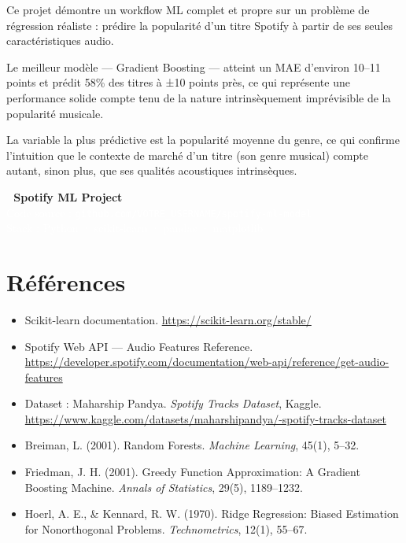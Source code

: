 \documentclass[12pt, a4paper]{article}
\begin{document}
Ce projet démontre un workflow ML complet et propre sur un problème de régression
réaliste : prédire la popularité d'un titre Spotify à partir de ses seules
caractéristiques audio.

Le meilleur modèle — Gradient Boosting — atteint un MAE d'environ 10–11 points et
prédit 58\% des titres à ±10 points près, ce qui représente une performance solide
compte tenu de la nature intrinsèquement imprévisible de la popularité musicale.

La variable la plus prédictive est la popularité moyenne du genre, ce qui confirme
l'intuition que le contexte de marché d'un titre (son genre musical) compte autant,
sinon plus, que ses qualités acoustiques intrinsèques.

\vspace{1cm}
\begin{center}
  \begin{tcolorbox}[colback=spotdark, colframe=spotdark, width=0.85\textwidth,
                    halign=center, rounded corners]
    \textcolor{spotgreen}{\large\bfseries 🎵 Spotify ML Project}\\[0.3cm]
    \textcolor{white}{\small Code source :
      \textcolor{spotgreen}{\texttt{github.com/VOTRE\_USERNAME/spotify-ml-model}}}\\
    \textcolor{white}{\small Stack : Python · scikit-learn · pandas · matplotlib}
  \end{tcolorbox}
\end{center}

\newpage
\section*{Références}

\begin{itemize}[leftmargin=1.5cm]
  \item Scikit-learn documentation. \url{https://scikit-learn.org/stable/}
  \item Spotify Web API — Audio Features Reference.
        \url{https://developer.spotify.com/documentation/web-api/reference/get-audio-features}
  \item Dataset : Maharship Pandya. \textit{Spotify Tracks Dataset}, Kaggle.
        \url{https://www.kaggle.com/datasets/maharshipandya/-spotify-tracks-dataset}
  \item Breiman, L. (2001). Random Forests.
        \textit{Machine Learning}, 45(1), 5–32.
  \item Friedman, J. H. (2001). Greedy Function Approximation: A Gradient Boosting Machine.
        \textit{Annals of Statistics}, 29(5), 1189–1232.
  \item Hoerl, A. E., \& Kennard, R. W. (1970). Ridge Regression: Biased Estimation
        for Nonorthogonal Problems. \textit{Technometrics}, 12(1), 55–67.
\end{itemize}
\end{document}
